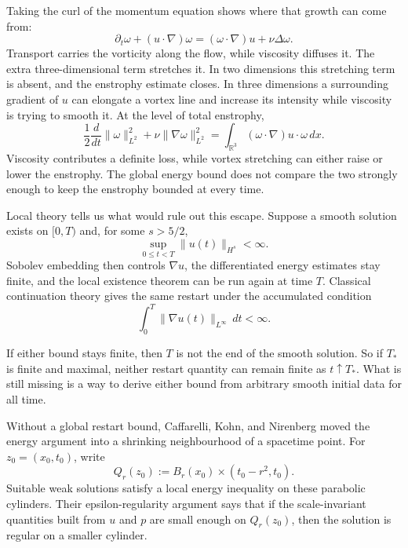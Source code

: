 Taking the curl of the momentum equation shows where that growth can come from:
\begin{equation}\label{eq:HistoricalVorticityEquation}
  \partial_t\omega+(u\cdot\nabla)\omega
  =
  (\omega\cdot\nabla)u+\nu\Delta\omega.
\end{equation}
Transport carries the vorticity along the flow, while viscosity diffuses it.
The extra three-dimensional term stretches it.
In two dimensions this stretching term is absent, and the enstrophy estimate closes.
In three dimensions a surrounding gradient of \(u\) can elongate a vortex line and increase its intensity while viscosity is trying to smooth it.
At the level of total enstrophy,
\[
  \frac12\frac{d}{dt}\lVert\omega\rVert_{L^2}^{2}
  +\nu\lVert\nabla\omega\rVert_{L^2}^{2}
  =
  \int_{\mathbb R^3}(\omega\cdot\nabla)u\cdot\omega\,dx.
\]
Viscosity contributes a definite loss, while vortex stretching can either raise or lower the enstrophy.
The global energy bound does not compare the two strongly enough to keep the enstrophy bounded at every time.


Local theory tells us what would rule out this escape.
Suppose a smooth solution exists on \([0,T)\) and, for some \(s>5/2\),
\begin{equation}\label{eq:HistoricalSobolevContinuation}
  \sup_{0\leq t<T}\lVert u(t)\rVert_{H^s}<\infty.
\end{equation}
Sobolev embedding then controls \(\nabla u\), the differentiated energy estimates stay finite, and the local existence theorem can be run again at time \(T\).
Classical continuation theory gives the same restart under the accumulated condition \parencite{FujitaKato1964,Kato1984}
\[
  \int_0^T\lVert\nabla u(t)\rVert_{L^\infty}\,dt<\infty.
\]

If either bound stays finite, then \(T\) is not the end of the smooth solution.
So if \(T_*\) is finite and maximal, neither restart quantity can remain finite as \(t\uparrow T_*\).
What is still missing is a way to derive either bound from arbitrary smooth initial data for all time.


Without a global restart bound, Caffarelli, Kohn, and Nirenberg moved the energy argument into a shrinking neighbourhood of a spacetime point.
For \(z_0=(x_0,t_0)\), write
\[
  Q_r(z_0)
  :=
  B_r(x_0)\times(t_0-r^2,t_0).
\]
Suitable weak solutions satisfy a local energy inequality on these parabolic cylinders.
Their epsilon-regularity argument says that if the scale-invariant quantities built from \(u\) and \(p\) are small enough on \(Q_r(z_0)\), then the solution is regular on a smaller cylinder.

